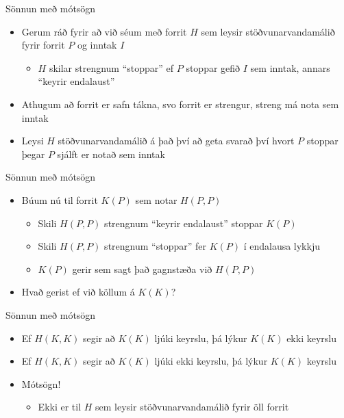 \documentclass[handout]{beamer}
\begin{document}
\begin{frame}{Sönnun með mótsögn}
\begin{itemize}
 \item Gerum ráð fyrir að við séum með forrit $H$ sem leysir stöðvunarvandamálið fyrir forrit $P$ og inntak $I$
 \begin{itemize}
  \item $H$ skilar strengnum ``stoppar'' ef $P$ stoppar gefið $I$ sem inntak, annars ``keyrir endalaust'' \pause
 \end{itemize}
 \item Athugum að forrit er safn tákna, svo forrit er strengur, streng má nota sem inntak
 \item Leysi $H$ stöðvunarvandamálið á það því að geta svarað því hvort $P$ stoppar þegar $P$ sjálft er notað sem inntak
\end{itemize}
\end{frame}

\begin{frame}{Sönnun með mótsögn}
\begin{itemize}
 \item Búum nú til forrit $K(P)$ sem notar $H(P, P)$
 \begin{itemize}
  \item Skili $H(P, P)$ strengnum ``keyrir endalaust'' stoppar $K(P)$ 
  \item Skili $H(P, P)$ strengnum ``stoppar'' fer $K(P)$ í endalausa lykkju
  \item $K(P)$ gerir sem sagt það gagnstæða við $H(P, P)$
 \end{itemize}
 \item Hvað gerist ef við köllum á $K(K)$?
\end{itemize}
\end{frame}

\begin{frame}{Sönnun með mótsögn}
\begin{itemize}
 \item Ef $H(K, K)$ segir að $K(K)$ ljúki keyrslu, þá lýkur $K(K)$ ekki keyrslu
 \item Ef $H(K, K)$ segir að $K(K)$ ljúki ekki keyrslu, þá lýkur $K(K)$ keyrslu
 \item Mótsögn!
 \begin{itemize}
  \item Ekki er til $H$ sem leysir stöðvunarvandamálið fyrir öll forrit
 \end{itemize}
\end{itemize}
\end{frame}
\end{document}
